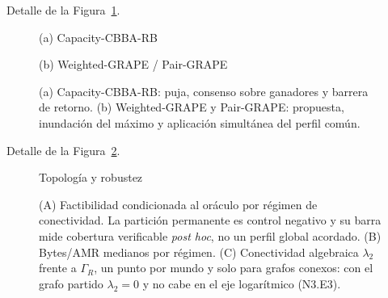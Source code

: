 



Detalle de la Figura~\ref{fig:n3-metodos}.

\begin{figure}[H]\centering
{}
{(a) Capacity-CBBA-RB}
\par\vspace{.5mm}
{(b) Weighted-GRAPE / Pair-GRAPE}
\caption{(a) Capacity-CBBA-RB: puja, consenso sobre ganadores y barrera de retorno.
(b) Weighted-GRAPE y Pair-GRAPE: propuesta, inundación del máximo y aplicación
simultánea del perfil común.}
\label{fig:n3-metodos}
\end{figure}






Detalle de la Figura~\ref{fig:n3-topologia}.

\begin{figure}[H]\centering
{}
{Topología y robustez}
\caption{(A) Factibilidad condicionada al oráculo por régimen de conectividad. La
partición permanente es control negativo y su barra mide cobertura verificable
\emph{post hoc}, no un perfil global acordado. (B) Bytes/AMR medianos por régimen.
(C) Conectividad algebraica $\lambda_2$ frente a $\Gamma_R$, un punto por mundo y
solo para grafos conexos: con el grafo partido $\lambda_2=0$ y no cabe en el eje
logarítmico (N3.E3).}
\label{fig:n3-topologia}
\viuownsource
\end{figure}

